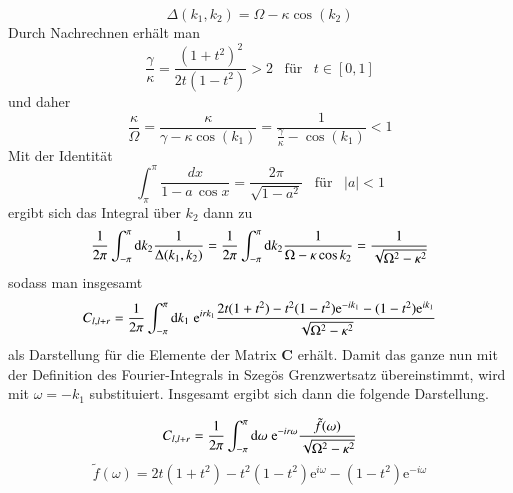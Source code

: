\begin{equation}
\Delta(k_1, k_2) = \Omega - \kappa \cos(k_2)
\end{equation}
Durch Nachrechnen erhält man 
\begin{equation}
 \frac{\gamma}{\kappa} = \frac{(1+t^2)^2}{2t(1-t^2)}> 2 \;\;\;\text{für}\;\;\; t\in \left[0,1\right] 
\end{equation}
und daher  
\begin{equation}
\frac{\kappa}{\Omega} = \frac{\kappa}{\gamma - \kappa \cos(k_1)}  = \frac{1}{\frac{\gamma}{ \kappa} - \cos(k_1)} < 1 
\end{equation}
Mit der Identität 
\begin{equation}
\int_{\pi}^{\pi} \frac{dx}{1 - a\,\cos{x}} = \frac{2\pi}{\sqrt{1 - a^2}} \;\;\;\text{für}\;\;\; |a| < 1 
\end{equation}
ergibt sich das Integral über $k_2$ dann zu
\begin{equation}
\frac{1}{2\pi}\int_{-\pi}^{\pi} \mathrm{d} k_2  \frac{1}{\Delta(k_1, k_2)} = \frac{1}{2\pi}\int_{-\pi}^{\pi} \mathrm{d} k_2  \frac{1}{\Omega - \kappa \cos{k_2}} = \frac{1}{\sqrt{\Omega^2 - \kappa^2}}  
\end{equation}
sodass man insgesamt 
\begin{equation}
C_{l,l+r} = \frac{1}{2\pi} \int_{-\pi}^{\pi} \mathrm{d} k_1  \;\mathrm{e}^{i  r k_1} \frac{2t(1+t^2) - t^2(1-t^2)\mathrm{e}^{-i k_1} - (1-t^2)\mathrm{e}^{i k_1}}{\sqrt{\Omega^2 - \kappa^2}}
\end{equation}
als Darstellung für die Elemente der Matrix $\bm{C}$ erhält. Damit das ganze nun mit der Definition des Fourier-Integrals in Szegös Grenzwertsatz übereinstimmt, wird mit $\omega = -k_1$ substituiert. Insgesamt ergibt sich dann die folgende Darstellung.  

\begin{grayframe}
\begin{equation}
C_{l,l+r} = \frac{1}{2\pi} \int_{-\pi}^{\pi} \mathrm{d}\omega  \;\mathrm{e}^{-i  r \omega} \frac{\tilde{f}(\omega)}{\sqrt{\Omega^2 - \kappa^2}}
\end{equation}
\begin{equation}
\tilde{f}(\omega) = 2t(1+t^2) - t^2(1-t^2)\mathrm{e}^{i \omega} - (1-t^2)\mathrm{e}^{-i \omega}
\end{equation}
\end{grayframe}

